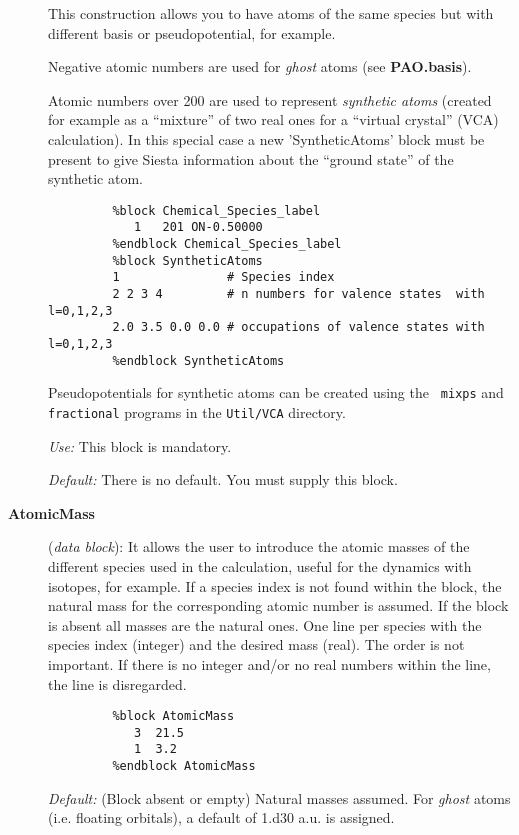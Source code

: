 \documentclass[11pt]{article}
\begin{document}
\begin{description}
This construction allows you to have atoms of the same species but with
different basis or pseudopotential, for example.

Negative atomic numbers are used for {\it ghost} atoms
(see {\bf PAO.basis}).

Atomic numbers over 200 are used to represent {\it synthetic atoms}
 (created for example as a ``mixture'' of two
real ones for a ``virtual crystal'' (VCA) calculation). In
this special case a new 'SyntheticAtoms' block
  must be present to give
{\sc Siesta} information about the ``ground state'' of the synthetic
atom.

\begin{verbatim}
         %block Chemical_Species_label
            1   201 ON-0.50000
         %endblock Chemical_Species_label
         %block SyntheticAtoms
         1               # Species index
         2 2 3 4         # n numbers for valence states  with l=0,1,2,3
         2.0 3.5 0.0 0.0 # occupations of valence states with l=0,1,2,3
         %endblock SyntheticAtoms
\end{verbatim}

Pseudopotentials for synthetic atoms can be created using the {\tt
  mixps} and {\tt fractional} programs  in the {\tt Util/VCA} directory.

{\it Use:} This block is mandatory.

{\it Default:} There is no default. You must supply this block.



\item[{\bf AtomicMass}] ({\it data block}):
It allows the user to introduce
the atomic masses of the different species used in the calculation, useful
for the dynamics with isotopes, for example. If
a species index is not found within the block, the natural mass for the
corresponding atomic number is assumed. If the block is absent all masses
are the natural ones. One line per species with the species index (integer)
and the desired mass (real). The order is not important. If there is no
integer and/or no real numbers within the line, the line is disregarded.

\begin{verbatim}
         %block AtomicMass
            3  21.5
            1  3.2
         %endblock AtomicMass
\end{verbatim}

{\it Default:} (Block absent or empty) Natural masses assumed. For
{\it ghost} atoms (i.e. floating orbitals), a default of 1.d30 a.u. is
assigned.


\end{description}
\end{document}
